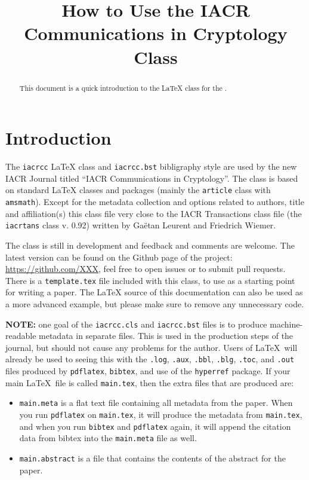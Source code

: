 \documentclass{iacrcc}
\title[running  = {The iacrcc class},
       onclick  = {https://github.com/IACR/latex},
       subtitle = {LaTeX Class Documentation (v0.10)},
      ]
      {How to Use the IACR Communications in Cryptology Class}
\affiliation[ror      = 031v4g827,
             onclick  = {https://www.nxp.com},
             street   = {Interleuvenlaan 80},
             city     = {Leuven},
             postcode = {3001},
             country  = {Belgium}
            ]{NXP Semiconductors}
\affiliation{Self}
\begin{document}
\maketitle


\begin{abstract}
  This document is a quick introduction to the \LaTeX{} class for the
  \publname{}.
\end{abstract}

\tableofcontents{}

\section*{Introduction}

The \texttt{iacrcc} \LaTeX{} class and \texttt{iacrcc.bst} bibligraphy
style are used by the new IACR Journal titled ``IACR Communications in Cryptology''.
The class is based on standard \LaTeX{} classes and packages
(mainly the \texttt{article} class with \texttt{amsmath}).
Except for the metadata collection and options related to authors, title and affiliation(s) this 
class file very close to the IACR Transactions class file (the \texttt{iacrtans} class v. 0.92) 
written by Ga{\"e}tan Leurent and Friedrich Wiemer.

The class is still in development and feedback and comments are welcome.
The latest version can be found on the Github page of the project:
\url{https://github.com/XXX}, feel free to open
issues or to submit pull requests.
There is a \texttt{template.tex} file included with this class, to use
as a starting point for writing a paper.  The \LaTeX{} source of this
documentation can also be used as a more advanced example, but please
make sure to remove any unnecessary code.

\textbf{NOTE:} one goal of the \texttt{iacrcc.cls} and
\texttt{iacrcc.bst} files is to produce machine-readable metadata in
separate files. This is used in the production steps of the journal,
but should not cause any problems for the author.  Users of
\LaTeX\ will already be used to seeing this with the \texttt{.log},
\texttt{.aux}, \texttt{.bbl}, \texttt{.blg}, \texttt{.toc}, and \texttt{.out} files
produced by \texttt{pdflatex}, \texttt{bibtex}, and use of the
\texttt{hyperref} package.  If your main \LaTeX\ file is called
\texttt{main.tex}, then the extra files that are produced are:
\begin{itemize}
\item \texttt{main.meta} is a flat text file containing all metadata from the paper.
  When you run \texttt{pdflatex} on \texttt{main.tex}, it will produce the metadata
  from \texttt{main.tex}, and when you run \texttt{bibtex} and \texttt{pdflatex} again,
  it will append the citation data from bibtex into the \texttt{main.meta} file as well.
\item \texttt{main.abstract} is a file that contains the contents of the abstract
  for the paper.
\end{itemize}
\end{document}
